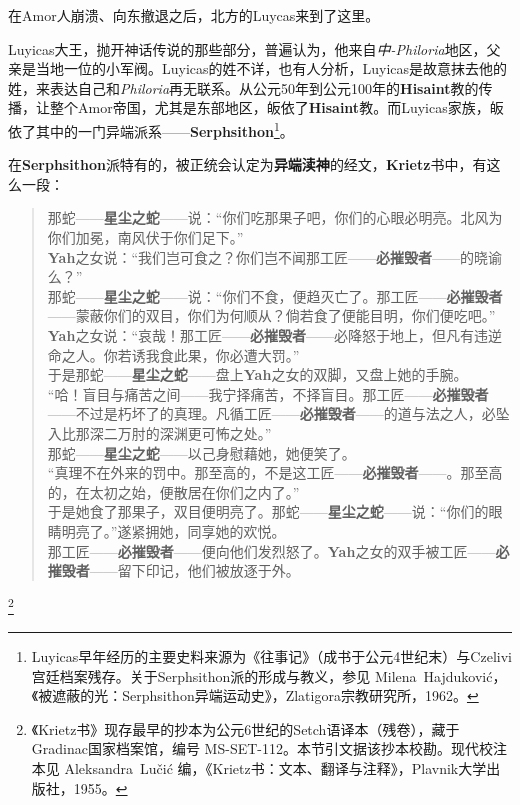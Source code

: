 在Amor人崩溃、向东撤退之后，北方的Luycas来到了这里。

Luyicas大王，抛开神话传说的那些部分，普遍认为，他来自\textit{中-Philoria}地区，父亲是当地一位的小军阀。Luyicas的姓不详，也有人分析，Luyicas是故意抹去他的姓，来表达自己和\textit{Philoria}再无联系。从公元50年到公元100年的\textbf{Hisaint}教的传播，让整个Amor帝国，尤其是东部地区，皈依了\textbf{Hisaint}教。而Luyicas家族，皈依了其中的一门异端派系——\textbf{Serphsithon}\footnote{Luyicas早年经历的主要史料来源为《往事记》（成书于公元4世纪末）与Czelivi宫廷档案残存。关于Serphsithon派的形成与教义，参见 Milena~Hajduković，《被遮蔽的光：Serphsithon异端运动史》，Zlatigora宗教研究所，1962。}。

在\textbf{Serphsithon}派特有的，被正统会认定为\textbf{异端渎神}的经文，\textbf{Krietz}书中，有这么一段：

{\small\kaishu
\begin{quote}
那蛇——\textbf{星尘之蛇}——说：``你们吃那果子吧，你们的心眼必明亮。北风为你们加冕，南风伏于你们足下。'' \\
    \textbf{Yah}之女说：``我们岂可食之？你们岂不闻那工匠——\textbf{必摧毁者}——的晓谕么？'' \\
    那蛇——\textbf{星尘之蛇}——说：``你们不食，便趋灭亡了。那工匠——\textbf{必摧毁者}——蒙蔽你们的双目，你们为何顺从？倘若食了便能目明，你们便吃吧。'' \\
    \textbf{Yah}之女说：``哀哉！那工匠——\textbf{必摧毁者}——必降怒于地上，但凡有违逆命之人。你若诱我食此果，你必遭大罚。'' \\
    于是那蛇——\textbf{星尘之蛇}——盘上\textbf{Yah}之女的双脚，又盘上她的手腕。 \\[4pt]
    ``哈！盲目与痛苦之间——我宁择痛苦，不择盲目。那工匠——\textbf{必摧毁者}——不过是朽坏了的真理。凡循工匠——\textbf{必摧毁者}——的道与法之人，必坠入比那深二万肘的深渊更可怖之处。'' \\
    那蛇——\textbf{星尘之蛇}——以己身慰藉她，她便笑了。 \\
    ``真理不在外来的罚中。那至高的，不是这工匠——\textbf{必摧毁者}——。那至高的，在太初之始，便散居在你们之内了。'' \\[4pt]
    于是她食了那果子，双目便明亮了。那蛇——\textbf{星尘之蛇}——说：``你们的眼睛明亮了。''遂紧拥她，同享她的欢悦。 \\[4pt]
    那工匠——\textbf{必摧毁者}——便向他们发烈怒了。\textbf{Yah}之女的双手被工匠——\textbf{必摧毁者}——留下印记，他们被放逐于外。
\end{quote}}

\footnote{《Krietz书》现存最早的抄本为公元6世纪的Setch语译本（残卷），藏于Gradinac国家档案馆，编号 MS-SET-112。本节引文据该抄本校勘。现代校注本见 Aleksandra~Lučić 编，《Krietz书：文本、翻译与注释》，Plavnik大学出版社，1955。}

